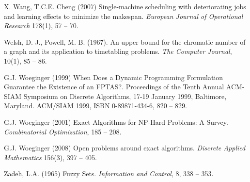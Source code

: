 \documentclass[11pt]{article}
\begin{document}
\begin{thebibliography}{19}
X. Wang, T.C.E. Cheng (2007) 
Single-machine scheduling with deteriorating jobs and learning effects to minimize the makespan. 
\textit{European Journal of Operational Research} 178(1), 57 -- 70.

Welsh, D. J., Powell, M. B. (1967). 
An upper bound for the chromatic number of a graph and its application to timetabling problems. 
\textit{The Computer Journal}, 10(1), 85 -- 86.

G.J. Woeginger (1999) 
When Does a Dynamic Programming Formulation Guarantee the Existence of an FPTAS?. 
Proceedings of the Tenth Annual ACM-SIAM Symposium on Discrete Algorithms, 17-19 January 1999, Baltimore, Maryland. ACM/SIAM 1999, ISBN 0-89871-434-6, 820 -- 829.

G.J. Woeginger (2001) 
Exact Algorithms for NP-Hard Problems: A Survey. 
\textit{Combinatorial Optimization}, 185 -- 208.

G.J. Woeginger (2008) 
Open problems around exact algorithms. 
\textit{Discrete Applied Mathematics} 156(3), 397 -- 405.

Zadeh, L.A. (1965) 
Fuzzy Sets. 
\textit{Information and Control}, 8, 338 -- 353.



\end{thebibliography}
\end{document}
